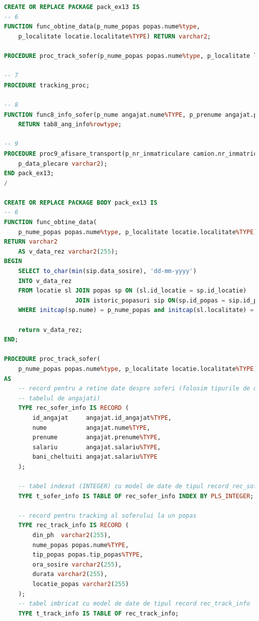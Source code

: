 \documentclass[12pt, a4paper]{article}
\begin{document}
\begin{lstlisting}[language=SQL]
CREATE OR REPLACE PACKAGE pack_ex13 IS
-- 6
FUNCTION func_obtine_data(p_nume_popas popas.nume%type, 
    p_localitate locatie.localitate%TYPE) RETURN varchar2;

PROCEDURE proc_track_sofer(p_nume_popas popas.nume%type, p_localitate locatie.localitate%TYPE);

-- 7
PROCEDURE tracking_proc;

-- 8
FUNCTION func8_info_sofer(p_nume angajat.nume%TYPE, p_prenume angajat.prenume%TYPE)
    RETURN tab8_ang_info%rowtype;
    
-- 9 
PROCEDURE proc9_afisare_transport(p_nr_inmatriculare camion.nr_inmatriculare%TYPE,
    p_data_plecare varchar2);
END pack_ex13;
/

CREATE OR REPLACE PACKAGE BODY pack_ex13 IS
-- 6
FUNCTION func_obtine_data(
    p_nume_popas popas.nume%type, p_localitate locatie.localitate%TYPE)
RETURN varchar2
    AS v_data_rez varchar2(255);
BEGIN
    SELECT to_char(min(sip.data_sosire), 'dd-mm-yyyy')
    INTO v_data_rez
    FROM locatie sl JOIN popas sp ON (sl.id_locatie = sp.id_locatie)
                    JOIN istoric_popasuri sip ON(sp.id_popas = sip.id_popas)
    WHERE initcap(sp.nume) = p_nume_popas and initcap(sl.localitate) = p_localitate;
    
    return v_data_rez;
END;

PROCEDURE proc_track_sofer(
    p_nume_popas popas.nume%type, p_localitate locatie.localitate%TYPE)
AS
    -- record pentru a retine date despre soferi (folosim tipurile de date din
    -- tabelul de angajati)
    TYPE rec_sofer_info IS RECORD (
        id_angajat     angajat.id_angajat%TYPE,
        nume           angajat.nume%TYPE,
        prenume        angajat.prenume%TYPE,
        salariu        angajat.salariu%TYPE,
        bani_cheltuiti angajat.salariu%TYPE
    );
    
    -- tabel indexat (INTEGER) cu model de date de tipul record rec_sofer_info
    TYPE t_sofer_info IS TABLE OF rec_sofer_info INDEX BY PLS_INTEGER;
    
    -- record pentru tracking al soferului la un popas
    TYPE rec_track_info IS RECORD (
        din_ph  varchar2(255),
        nume_popas popas.nume%TYPE,
        tip_popas popas.tip_popas%TYPE,
        ora_sosire varchar2(255),
        durata varchar2(255),
        locatie_popas varchar2(255)
    );
    -- tabel imbricat cu model de date de tipul record rec_track_info
    TYPE t_track_info IS TABLE OF rec_track_info;
    

\end{lstlisting}
\end{document}
